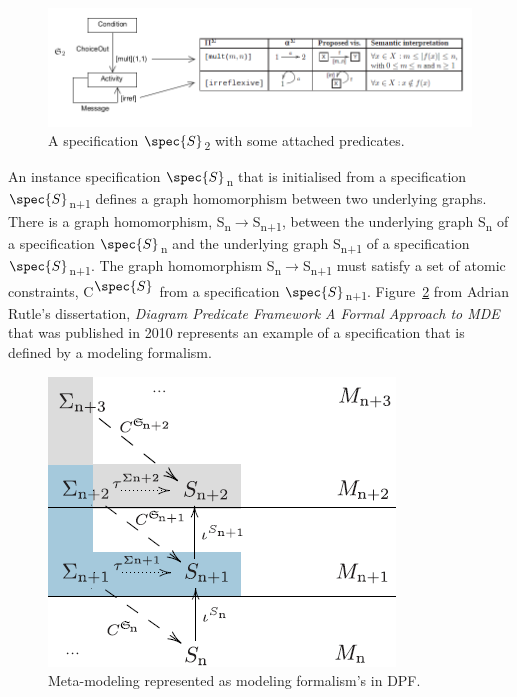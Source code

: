 \begin{figure}[H]
	\centering
	\includegraphics[scale=0.7]{./Figures/DPF_spec_constraints.png}
	\caption[A specification and some predefined diagrammatic predicate attached]
	{A specification $\spec{S}$\textsubscript{2} with some attached predicates.}
	\label{fig:DPF_Spec}
\end{figure}

An instance specification $\spec{S}$\textsubscript{n} that is initialised from
a specification $\spec{S}$\textsubscript{n+1} defines a graph homomorphism
between two underlying graphs. There is a graph homomorphism,
S\textsubscript{n}$\longrightarrow$S\textsubscript{n+1}, between the underlying
graph S\textsubscript{n} of a specification $\spec{S}$\textsubscript{n} and the
underlying graph S\textsubscript{n+1} of
a specification $\spec{S}$\textsubscript{n+1}\cite{Lamo2013}. The graph
homomorphism S\textsubscript{n}$\longrightarrow$S\textsubscript{n+1} must
satisfy a set of atomic constraints, C\textsuperscript{$\spec{S}$} from a
specification $\spec{S}$\textsubscript{n+1}.
Figure~\ref{fig:modeling_formlalism} from Adrian Rutle's dissertation,
 \textit{Diagram Predicate Framework A Formal Approach to
MDE}\cite{Rutle_thesis} that was published in 2010 represents an example of a
specification that is defined by a modeling formalism. 

\begin{figure}[H]
	\centering
	\includegraphics[scale=0.7]{./Figures/modeling_formlalism_adrian.png}
	\caption[Modeling formalism in DPF]
	{Meta-modeling represented as modeling formalism's in DPF.}
	\label{fig:modeling_formlalism}
\end{figure}

